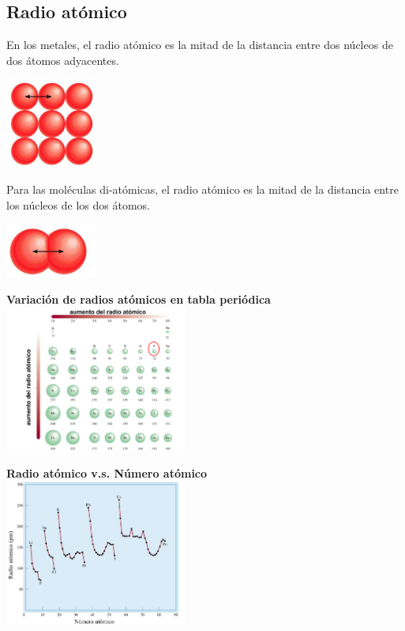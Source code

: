     \subsection{Radio atómico}
        \indent En los metales, el radio atómico es la mitad de la distancia entre dos núcleos de dos átomos adyacentes.
        \begin{center} \includegraphics[width=3cm]{./imagenes/radioAtomicoMetales.png} \end{center}
        \indent Para las moléculas di-atómicas, el radio atómico es la mitad de la distancia entre los núcleos de los dos átomos.
        \begin{center} \includegraphics[width=3cm]{./imagenes/radioAtomicoDiMoleculas.png} \end{center}
        \begin{center} \textbf{Variación de radios atómicos en tabla periódica} \\[10pt] \includegraphics[width=6cm]{./imagenes/radiosAtomicosVariacion.png} \end{center}
        \begin{center} \textbf{Radio atómico v.s. Número atómico} \\[10pt] \includegraphics[width=6cm]{./imagenes/radioAtomicoVSNumeroAtomico.png} \end{center}
